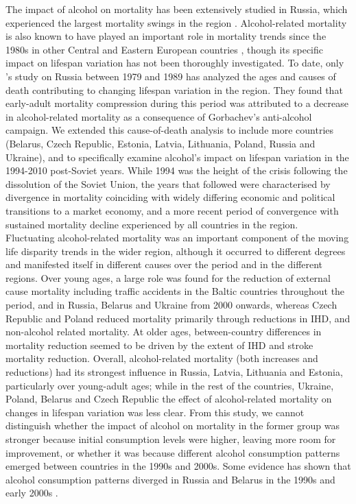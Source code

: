 \documentclass{article}
\begin{document}
\begin{spacing}{1.5}
The impact of alcohol on mortality has been extensively studied in Russia, which experienced the largest mortality swings in the region \citep{leon1997huge,rehm2007, shkolnikov2013components,shkolnikov2001}. Alcohol-related mortality is also known to have played an important role in mortality trends since the 1980s in other Central and Eastern European countries \citep{ rehm2007}, though its specific impact on lifespan variation has not been thoroughly investigated. To date, only \citet{shkolnikov2003}'s study on Russia between 1979 and 1989 has analyzed the ages and causes of death contributing to changing lifespan variation in the region. They found that early-adult mortality compression during this period was attributed to a decrease in alcohol-related mortality as a consequence of Gorbachev's anti-alcohol campaign. We extended this cause-of-death analysis to include more countries (Belarus, Czech Republic, Estonia, Latvia, Lithuania, Poland, Russia and Ukraine), and to specifically examine alcohol's impact on lifespan variation in the 1994-2010 post-Soviet years. While 1994 was the height of the crisis following the dissolution of the Soviet Union, the years that followed were characterised by divergence in mortality coinciding with widely differing economic and political transitions to a market economy, and a more recent period of convergence with sustained mortality decline experienced by all countries in the region.\\

Fluctuating alcohol-related mortality was an important component of the moving life disparity trends in the wider region, although it occurred to different degrees and manifested itself in different causes over the period and in the different regions.  Over young ages, a large role was found for the reduction of external cause mortality including traffic accidents in the Baltic countries throughout the period, and in Russia, Belarus and Ukraine from 2000 onwards, whereas Czech Republic and Poland reduced mortality primarily through reductions in IHD, and non-alcohol related mortality. At older ages, between-country differences in mortality reduction seemed to be driven by the extent of IHD and stroke mortality reduction. Overall, alcohol-related mortality (both increases and reductions) had its strongest influence in Russia, Latvia, Lithuania and Estonia, particularly over young-adult ages; while in the rest of the countries, Ukraine, Poland, Belarus and Czech Republic the effect of alcohol-related mortality on changes in lifespan variation was less clear. From this study, we cannot distinguish whether the impact of alcohol on mortality in the former group was stronger because initial consumption levels were higher, leaving more room for improvement, or whether it was because different alcohol consumption patterns emerged between countries in the 1990s and 2000s. Some evidence has shown that alcohol consumption patterns diverged in Russia and Belarus in the 1990s and early 2000s \citep{grigoriev2015}. \\


\end{spacing}
\end{document}
